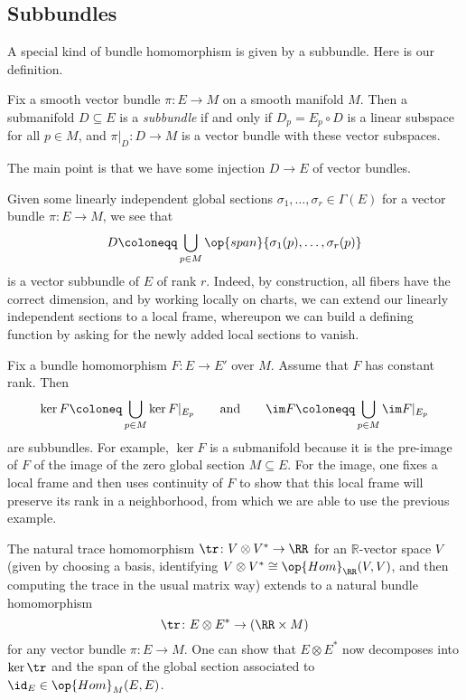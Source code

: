\documentclass[../notes.tex]{subfiles}
\begin{document}
\subsection{Subbundles}
A special kind of bundle homomorphism is given by a subbundle. Here is our definition.
\begin{definition}[subbundle]
	Fix a smooth vector bundle $\pi\colon E\to M$ on a smooth manifold $M$. Then a submanifold $D\subseteq E$ is a \textit{subbundle} if and only if $D_p=E_p\circ D$ is a linear subspace for all $p\in M$, and $\pi|_D\colon D\to M$ is a vector bundle with these vector subspaces.
\end{definition}
The main point is that we have some injection $D\to E$ of vector bundles.
\begin{example}
	Given some linearly independent global sections $\sigma_1,\ldots,\sigma_r\in\Gamma(E)$ for a vector bundle $\pi\colon E\to M$, we see that
	\[D\coloneqq\bigcup_{p\in M}\op{span}\{\sigma_1(p),\ldots,\sigma_r(p)\}\]
	is a vector subbundle of $E$ of rank $r$. Indeed, by construction, all fibers have the correct dimension, and by working locally on charts, we can extend our linearly independent sections to a local frame, whereupon we can build a defining function by asking for the newly added local sections to vanish.
\end{example}
\begin{example}
	Fix a bundle homomorphism $F\colon E\to E'$ over $M$. Assume that $F$ has constant rank. Then
	\[\ker F\coloneq\bigcup_{p\in M}\ker F|_{E_p}\qquad\text{and}\qquad\im F\coloneqq\bigcup_{p\in M}\im F|_{E_p}\]
	are subbundles. For example, $\ker F$ is a submanifold because it is the pre-image of $F$ of the image of the zero global section $M\subseteq E$. For the image, one fixes a local frame and then uses continuity of $F$ to show that this local frame will preserve its rank in a neighborhood, from which we are able to use the previous example.
\end{example}
\begin{example}
	The natural trace homomorphism $\tr\colon V\otimes V^*\to\RR$ for an $\mathbb R$-vector space $V$ (given by choosing a basis, identifying $V\otimes V^*\cong\op{Hom}_\RR(V,V)$, and then computing the trace in the usual matrix way) extends to a natural bundle homomorphism
	\[\tr\colon E\otimes E^*\to(\RR\times M)\]
	for any vector bundle $\pi\colon E\to M$. One can show that $E\otimes E^*$ now decomposes into $\ker\tr$ and the span of the global section associated to ${\id_E}\in\op{Hom}_M(E,E)$.
\end{example}
\end{document}
